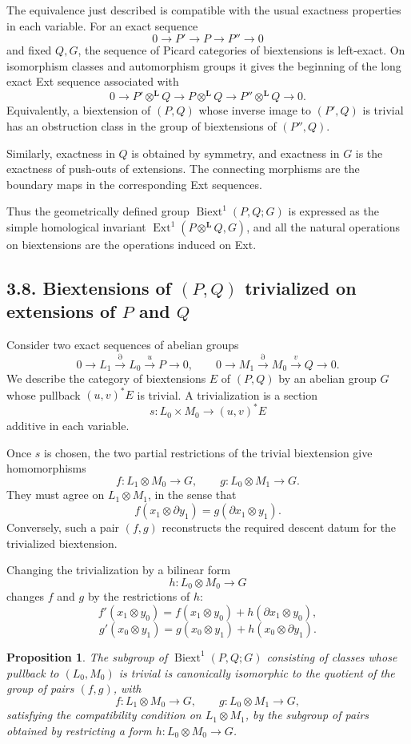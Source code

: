 \documentclass[11pt]{article}
\newtheorem{proposition}{Proposition}[section]
\newcommand{\bL}{\mathbf L}
\newcommand{\Ext}{\operatorname{Ext}}
\newcommand{\Biext}{\operatorname{Biext}}
\begin{document}
The equivalence just described is compatible with the usual exactness properties
in each variable. For an exact sequence
\[
0\to P'\to P\to P''\to 0
\]
and fixed \(Q,G\), the sequence of Picard categories of biextensions is
left-exact. On isomorphism classes and automorphism groups it gives the beginning
of the long exact Ext sequence associated with
\[
0\to P'\otimes^{\bL}Q\to P\otimes^{\bL}Q\to
P''\otimes^{\bL}Q\to 0.
\]
Equivalently, a biextension of \((P,Q)\) whose inverse image to \((P',Q)\) is
trivial has an obstruction class in the group of biextensions of
\((P'',Q)\).

Similarly, exactness in \(Q\) is obtained by symmetry, and exactness in \(G\) is
the exactness of push-outs of extensions. The connecting morphisms are the
boundary maps in the corresponding Ext sequences.

Thus the geometrically defined group \(\Biext^1(P,Q;G)\) is expressed as the
simple homological invariant \(\Ext^1(P\otimes^{\bL}Q,G)\), and all the natural
operations on biextensions are the operations induced on Ext.

\subsection*{3.8. Biextensions of \((P,Q)\) trivialized on extensions of \(P\) and \(Q\)}

Consider two exact sequences of abelian groups
\[
0\to L_1\xrightarrow{\partial} L_0\xrightarrow{u}P\to 0,\qquad
0\to M_1\xrightarrow{\partial} M_0\xrightarrow{v}Q\to 0.
\]
We describe the category of biextensions \(E\) of \((P,Q)\) by an abelian group
\(G\) whose pullback \((u,v)^*E\) is trivial. A trivialization is a section
\[
s:L_0\times M_0\longrightarrow (u,v)^*E
\]
additive in each variable.

Once \(s\) is chosen, the two partial restrictions of the trivial biextension
give homomorphisms
\[
f:L_1\otimes M_0\to G,\qquad
g:L_0\otimes M_1\to G.
\]
They must agree on \(L_1\otimes M_1\), in the sense that
\[
f(x_1\otimes \partial y_1)=g(\partial x_1\otimes y_1).
\]
Conversely, such a pair \((f,g)\) reconstructs the required descent datum for the
trivialized biextension.

Changing the trivialization by a bilinear form
\[
h:L_0\otimes M_0\to G
\]
changes \(f\) and \(g\) by the restrictions of \(h\):
\[
f'(x_1\otimes y_0)=f(x_1\otimes y_0)+h(\partial x_1\otimes y_0),
\]
\[
g'(x_0\otimes y_1)=g(x_0\otimes y_1)+h(x_0\otimes \partial y_1).
\]

\begin{proposition}
The subgroup of \(\Biext^1(P,Q;G)\) consisting of classes whose pullback to
\((L_0,M_0)\) is trivial is canonically isomorphic to the quotient of the group
of pairs \((f,g)\), with
\[
f:L_1\otimes M_0\to G,\qquad g:L_0\otimes M_1\to G,
\]
satisfying the compatibility condition on \(L_1\otimes M_1\), by the subgroup of
pairs obtained by restricting a form \(h:L_0\otimes M_0\to G\).
\end{proposition}
\end{document}
